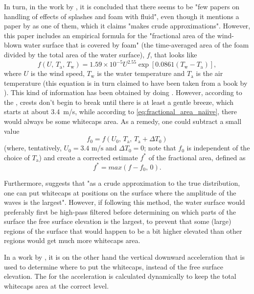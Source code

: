 In turn, in the work by \citet{Takahashi2003}, it is concluded that there seems to be "few papers on handling of effects of splashes and foam with fluid", even though it mentions a paper by \citet{Premovze2001} as one of them, which it claims "makes crude approximations". However, this paper includes an empirical formula for the "fractional area of the wind-blown water surface that is covered by foam" (the time-averaged area of the foam divided by the total area of the water surface), $f$, that looks like
%
\begin{equation} \label{eq:fractional_area_naiive}
f(U,\, T_{\text{a}},\, T_{\text{w}}) = 1.59 \times 10^{-5}U^{2.55}\exp[0.0861(T_{\text{w}} - T_{\text{a}})],
\end{equation}
%
where $U$ is the wind speed, $T_{\text{w}}$ is the water temperature and $T_{\text{a}}$ is the air temperature (this equation is in turn claimed to have been taken from a book by \citet{Monahan1986}). This kind of information has been obtained by doing . However, according to the , crests don't begin to break until there is at least a gentle breeze, which starts at about \mbox{3.4 m/s}, while according to \eqref{eq:fractional_area_naiive}, there would always be some whitecaps area. As a remedy, one could subtract a small value
%
\begin{equation}
f_0 = f(U_0,\, T_{\text{a}},\, T_{\text{a}}+\Delta T_0)
\end{equation}
%
(where, tentatively, ${U_0 = 3.4\text{ m/s}}$ and ${\Delta T_0 = 0}$; note that $f_0$ is independent of the choice of $T_{\text{a}}$) and create a corrected estimate $f^*$ of the fractional area, defined as
%
\begin{equation}
f^* = max(f-f_0,\,0).
\end{equation}

Furthermore, \citeauthor{Premovze2001} suggests that "as a crude approximation to the true distribution, one can put whitecaps at positions on the surface where the amplitude of the waves is the largest". However, if following this method, the water surface would preferably first be high-pass filtered before determining on which parts of the surface the free surface elevation is the largest, to prevent that some (large) regions of the surface that would happen to be a bit higher elevated than other regions would get much more whitecaps area.

In a work by \citet{Monnier}, it is on the other hand the vertical downward acceleration that is used to determine where to put the whitecaps, instead of the free surface elevation. The \threshold for the acceleration is calculated dynamically to keep the total whitecaps area at the correct level. 

